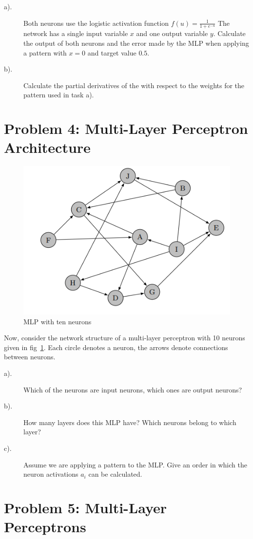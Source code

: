 \documentclass[12pt]{article}
\begin{document}
\begin{description}
	\item[a).]	Both neurons use the logistic activation function
	      $f(u)=\frac{1}{1+e^{-u}}$
	      The network has
	      a single input variable $x$ and one output variable $y$. Calculate the output of both
	      neurons and the error made by the MLP when applying a pattern with $x = 0$ and
	      target value $0.5$.
	\item[b).] Calculate the partial derivatives of the 
	 { }  
	 with respect to the weights for the pattern used in task a).
\end{description}

\section{Problem 4: Multi-Layer Perceptron Architecture}

\begin{figure}[!htbp]
	\centering
	\includegraphics[width=.55\textwidth]{fig/2018-03-19-13-54-31.png}
	\caption{MLP with ten neurons} \label{fig:mlp2}
\end{figure}

Now, consider the network structure of a multi-layer perceptron with 10 neurons given in
fig~\ref{fig:mlp2}. Each circle denotes a neuron, the arrows denote connections between neurons.
\begin{description}
	\item[a).]  Which of the neurons are input neurons, which ones are output neurons?
	\item[b).] How many layers does this MLP have? Which neurons belong to which layer?
	\item[c).] Assume we are applying a pattern to the MLP. Give an order in which the neuron
	      activations $a_i$ can be calculated.
\end{description}

\section{Problem 5: Multi-Layer Perceptrons}
\end{document}
